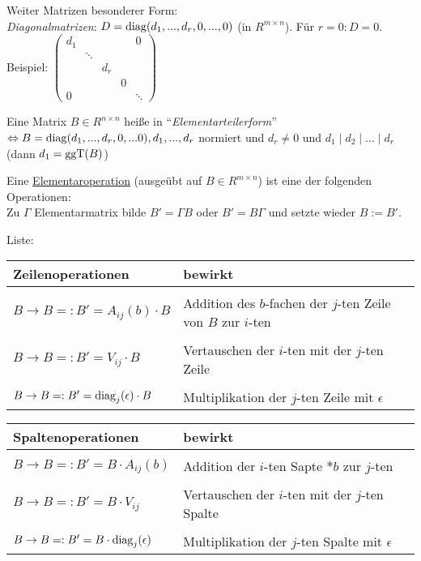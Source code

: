 \documentclass[a4paper,DIV15,BCOR12mm]{article}
\begin{document}
Weiter Matrizen besonderer Form:\\
\emph{Diagonalmatrizen}: $D = \mathop{\rm diag}\nolimits(d_1,...,d_r,0,...,0)$ (in $R^{m \times n}$). Für $r = 0: D = 0$.\\
Beispiel: $\begin{pmatrix}d_1 & & & & 0 \\
                              & \ddots & & & \\
                              & & d_r & & \\
                              & & & 0 & \\
                            0 & & & & \ddots\end{pmatrix}$

\begin{bemerkung}
    Eine Matrix $B \in R^{n \times n}$ heiße in "`\emph{Elementarteilerform}"' $\Leftrightarrow B = \mathop{\rm diag}\nolimits(d_1,...,d_r,0,...0), d_1,...,d_r$ normiert und $d_r \not=0$ und $d_1 \mid d_2 \mid ... \mid d_r$ (dann $d_1 = \mathop{\rm ggT}\nolimits(B)$)
\end{bemerkung}

Eine \underline{Elementaroperation} (ausgeübt auf $B \in R^{m \times n}$) ist eine der folgenden Operationen:\\
Zu $\Gamma$ Elementarmatrix bilde $B' = \Gamma B$ oder $B' =
B\Gamma$ und setzte wieder $B := B'$.

Liste:

\begin{tabular}{l|l}
    Zeilenoperationen & bewirkt \\
    \hline \\
    $B \to B =: B' = A_{ij}(b) \cdot B$        & Addition des $b$-fachen der $j$-ten Zeile von $B$ zur $i$-ten \\
    \hline \\
    $B \to B =: B' = V_{ij} \cdot B$           & Vertauschen der $i$-ten mit der $j$-ten Zeile \\
    \hline \\
    $B \to B =: B' = \mathop{\rm diag}\nolimits_j(\epsilon) \cdot B$ & Multiplikation der $j$-ten Zeile mit $\epsilon$
\end{tabular}

\begin{tabular}{l|l}
    Spaltenoperationen & bewirkt \\
    \hline \\
    $B \to B =: B' = B \cdot A_{ij}(b)$        & Addition der $i$-ten Sapte $*b$ zur $j$-ten \\
    \hline \\
    $B \to B =: B' = B \cdot V_{ij}$           & Vertauschen der $i$-ten mit der $j$-ten Spalte \\
    \hline \\
    $B \to B =: B' = B \cdot \mathop{\rm diag}\nolimits_j(\epsilon)$ & Multiplikation der $j$-ten Spalte mit $\epsilon$
\end{tabular}
\end{document}
